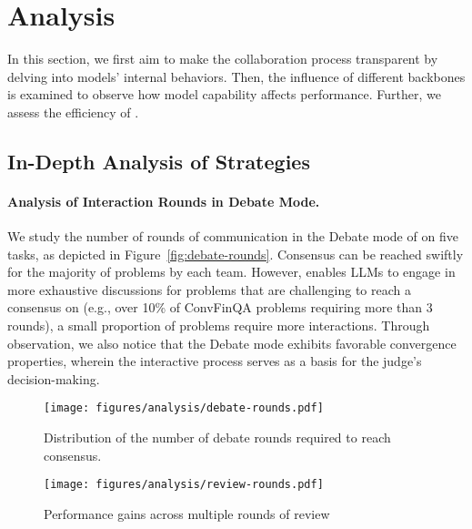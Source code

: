 \section{Analysis}

In this section, 
we first aim to make the collaboration process transparent by delving into models' internal behaviors.
Then,
the influence of different backbones is examined to observe how model capability affects performance.
Further,
we assess the efficiency of \ours.

\subsection{In-Depth Analysis of \ours Strategies}

\paragraph{Analysis of Interaction Rounds in Debate Mode.}
We study the number of rounds of communication in the Debate mode of \ours on five tasks,
as depicted in Figure~\ref{fig:debate-rounds}.
Consensus can be reached swiftly for the majority of problems by each team. 
However, 
\ours enables LLMs to engage in more exhaustive discussions for problems that are challenging to reach a consensus on (e.g., over 10\% of ConvFinQA problems requiring more than 3 rounds),
a small proportion of problems require more interactions.
Through observation,
we also notice that the Debate mode exhibits favorable convergence properties,
wherein the interactive process serves as a basis for the judge's decision-making.

\begin{figure}[ht]
    \centering
    \begin{minipage}[t]{0.48\textwidth}
        \texttt{[image: figures/analysis/debate-rounds.pdf]}
        \caption{Distribution of the number of debate rounds required to reach consensus.}
        \label{fig:debate-rounds}
    \end{minipage}
    \hfill
    \begin{minipage}[t]{0.48\textwidth}
        \texttt{[image: figures/analysis/review-rounds.pdf]}
        \caption{Performance gains across multiple rounds of review}
        \label{fig:review-rounds}
    \end{minipage}
    \vspace{-0.75em}
\end{figure}

